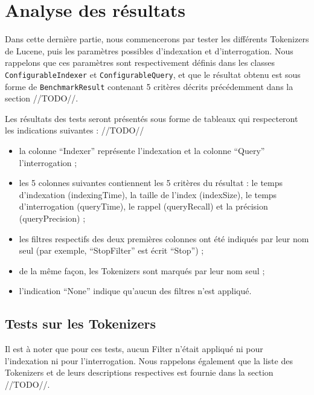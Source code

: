 \section{Analyse des résultats}

Dans cette dernière partie, nous commencerons par tester les différents Tokenizers de Lucene, puis les paramètres possibles d’indexation et d’interrogation. Nous rappelons que ces paramètres sont respectivement définis dans les classes \texttt{ConfigurableIndexer} et \texttt{ConfigurableQuery}, et que le résultat obtenu est sous forme de \texttt{BenchmarkResult} contenant 5 critères décrits précédemment dans la section //TODO//.

Les résultats des tests seront présentés sous forme de tableaux qui respecteront les indications suivantes : //TODO//
\begin{itemize}
\item la colonne “Indexer” représente l’indexation et la colonne “Query” l’interrogation ;
\item les 5 colonnes suivantes contiennent les 5 critères du résultat : le temps d’indexation (indexingTime), la taille de l’index (indexSize), le temps d’interrogation (queryTime), le rappel (queryRecall) et la précision (queryPrecision) ;
\item les filtres respectifs des deux premières colonnes ont été indiqués par leur nom seul (par exemple, “StopFilter” est écrit “Stop”) ;
\item de la même façon, les Tokenizers sont marqués par leur nom seul ;
\item l’indication “None” indique qu’aucun des filtres n’est appliqué.
\end{itemize}

\subsection{Tests sur les Tokenizers}

Il est à noter que pour ces tests, aucun Filter n’était appliqué ni pour l’indexation ni pour l’interrogation. Nous rappelons également que la liste des Tokenizers et de leurs descriptions respectives est fournie dans la section //TODO//.

